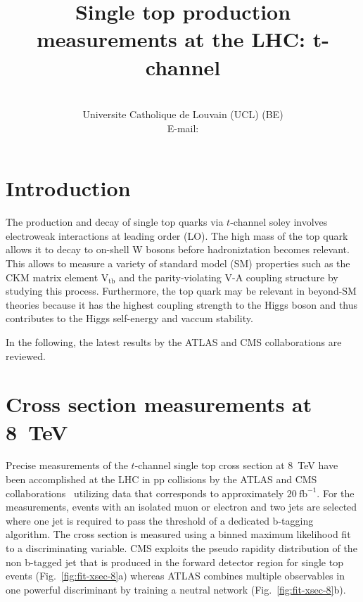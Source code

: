 \documentclass{PoS}
\title{Single top production measurements at the LHC: t-channel}
\author{
    \speaker{Matthias Komm}\\
    Universite Catholique de Louvain (UCL) (BE)\\
    E-mail: \email{Matthias.Komm@cern.ch}
}
\begin{document}
\section{Introduction}
The production and decay of single top quarks via $t$-channel soley involves electroweak interactions at leading order (LO). The high mass of the top quark allows it to decay to on-shell W bosons before hadroniztation becomes relevant. This allows to measure a variety of standard model (SM) properties such as the CKM matrix element $\mathrm{V_{tb}}$ and the parity-violating V-A coupling structure by studying this process. Furthermore, the top quark may be relevant in beyond-SM theories because it has the highest coupling strength to the Higgs boson and thus contributes to the Higgs self-energy and vaccum stability.

In the following, the latest results by the ATLAS and CMS collaborations are reviewed.

\section{Cross section measurements at 8~TeV}
Precise measurements of the $t$-channel single top cross section at 8~TeV have been accomplished at the LHC in pp collisions by the ATLAS and CMS collaborations~\cite{atlas-xsec8,cms-xsec8} utilizing data that corresponds to approximately $20~\mathrm{fb}^{-1}$. For the measurements, events with an isolated muon or electron and two jets are selected where one jet is required to pass the threshold of a dedicated b-tagging algorithm. The cross section is measured using a binned maximum likelihood fit to a discriminating variable. CMS exploits the pseudo rapidity distribution of the non b-tagged jet that is produced in the forward detector region for single top events (Fig.~\ref{fig:fit-xsec-8}a) whereas ATLAS combines multiple observables in one powerful discriminant by training a neutral network (Fig.~\ref{fig:fit-xsec-8}b).
\end{document}
